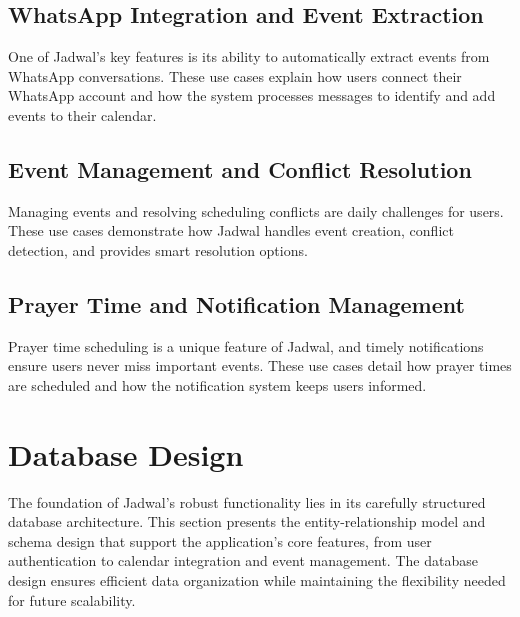 \documentclass[12pt,a4paper]{report}
\begin{document}
\subsection{WhatsApp Integration and Event Extraction}
One of Jadwal's key features is its ability to automatically extract events from WhatsApp conversations. These use cases explain how users connect their WhatsApp account and how the system processes messages to identify and add events to their calendar.




\subsection{Event Management and Conflict Resolution}
Managing events and resolving scheduling conflicts are daily challenges for users. These use cases demonstrate how Jadwal handles event creation, conflict detection, and provides smart resolution options.





\subsection{Prayer Time and Notification Management}
Prayer time scheduling is a unique feature of Jadwal, and timely notifications ensure users never miss important events. These use cases detail how prayer times are scheduled and how the notification system keeps users informed.









\section{Database Design}

The foundation of Jadwal's robust functionality lies in its carefully structured database architecture. This section presents the entity-relationship model and schema design that support the application's core features, from user authentication to calendar integration and event management. The database design ensures efficient data organization while maintaining the flexibility needed for future scalability.
\end{document}
